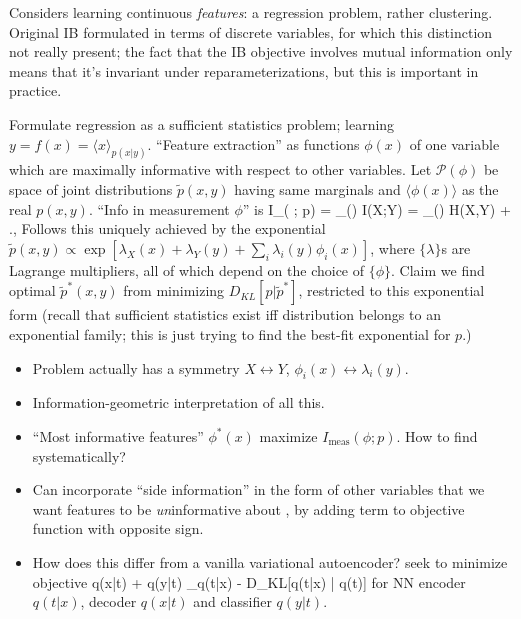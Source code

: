 \documentclass[notitlepage,openany,11pt]{report}
\numberwithin{equation}{section}
\theoremstyle{plain}%
\begin{document}
Considers learning continuous \emph{features}: a regression problem, rather clustering. Original IB formulated in terms of discrete variables, for which this distinction not really present; the fact that the IB objective involves mutual information only means that it's invariant under reparameterizations, but this is important in practice.

Formulate regression as a sufficient statistics problem; learning $y = f(x) = \langle x \rangle_{p(x|y)}$. ``Feature extraction'' as functions $\phi(x)$ of one variable which are maximally informative with respect to other variables. Let $\mathcal{P}(\phi)$ be space of joint distributions $\widetilde{p}(x,y)$ having same marginals and $\langle \phi(x) \rangle$ as the real $p(x,y)$. ``Info in measurement $\phi$'' is 
\be
I_{}( \phi; p) = \min_{(\phi)} I(X;Y) = \max_{(\phi)} H(X,Y) + ., 
\ee
Follows this uniquely achieved by the exponential $\widetilde{p}(x,y) \propto \exp \left[\lambda_{X}(x) + \lambda_{Y}(y) + \sum_{i} \lambda_{i}(y) \phi_{i}(x)\right]$, where $\{\lambda\}$s are Lagrange multipliers, all of which depend on the choice of $\{\phi\}$. Claim we find optimal $\widetilde{p}^{\ast}(x,y)$ from minimizing $D_{KL}[p | \widetilde{p}^{\ast}]$, restricted to this exponential form (recall that sufficient statistics exist iff distribution belongs to an exponential family; this is just trying to find the best-fit exponential for $p$.)


\begin{itemize}
\item Problem actually has a symmetry $X \leftrightarrow Y$, $\phi_{i}(x) \leftrightarrow \lambda_{i}(y)$. 
\item Information-geometric interpretation of all this. 
\item ``Most informative features'' $\phi^{\ast}(x)$ maximize $I_{\text{meas}}( \phi; p)$. How to find systematically?
\item Can incorporate ``side information'' in the form of other variables that we want features to be \emph{un}informative about \cite{GlobersonEtAl:12}, by adding term to objective function with opposite sign.
\item How does this differ from a vanilla variational autoencoder? \cite{BanijamaliEtAl:18} seek to minimize objective 
\be
\langle \log q(x|t) + \log q(y|t) \rangle_{q(t|x)} - D_{KL}[q(t|x) | q(t)]
\ee
for NN encoder $q(t|x)$, decoder $q(x|t)$ and classifier $q(y|t)$.
\end{itemize}
\end{document}
